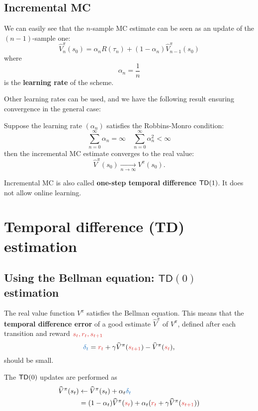 \documentclass[../course-notes.tex]{subfiles}
\begin{document}
\subsection{Incremental MC}

We can easily see that the $n$-sample MC estimate can be seen as an update of the $(n-1)$-sample one:
\[
	\widehat{V}_{n}^\pi(s_0) = \alpha_n R(\tau_{n}) + (1-\alpha_n) \widehat{V}^\pi_{n-1}(s_0)
\]
where
\[
	\alpha_n = \frac{1}{n}
\]
is the \textbf{learning rate} of the scheme.

Other learning rates can be used, and we have the following result ensuring convergence in the general case:
\begin{prop}
	Suppose the learning rate $(\alpha_n)$ satisfies the Robbins-Monro condition:
	\begin{equation}
	\sum_{n=0}^{\infty} \alpha_n = \infty \quad
	\sum_{n=0}^{\infty} \alpha_n^2 < \infty
	\end{equation}
	then the incremental MC estimate converges to the real value:
	\[
		\widehat{V}^\pi(s_0) \xrightarrow[n\to\infty]{} V^\pi(s_0).
	\]
\end{prop}

Incremental MC is also called \textbf{one-step temporal difference} $\mathsf{TD}(1)$. It does not allow online learning.



\section{Temporal difference (TD) estimation}

\subsection{Using the Bellman equation: $\mathsf{TD}(0)$ estimation}

The real value function $V^\pi$ satisfies the Bellman equation. This means that the \textbf{\bluefont temporal difference error} of a good estimate $\widehat{V}^\pi$ of $V^\pi$, defined after each transition and reward ${\redfont s_t,r_t,s_{t+1}}$
\begin{equation}\label{eq:ValueTDerror}
	{\bluefont\delta_t} = {\redfont r_t} + \gamma \widehat{V}^\pi({\redfont s_{t+1}}) - \widehat{V}^\pi({\redfont s_t}),
\end{equation}
should be small.

The $\mathsf{TD}(0)$ updates are performed as
\begin{align*}
	\widehat{V}^\pi(s_t) &\leftarrow
	\widehat{V}^\pi(s_t) + \alpha_t {\bluefont \delta_t} \\
	&= (1 - \alpha_t)\widehat{V}^\pi({\redfont s_t}) + \alpha_t ({\redfont r_t} + \gamma \widehat{V}^\pi({\redfont s_{t+1}}))
\end{align*}
\end{document}

